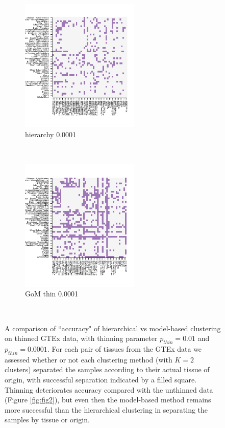 \begin{figure}[ht]
     \begin{subfigure}[t]{0.5\textwidth}
        \centering
        \includegraphics[height=2.5in]{../plots/rsz_1hierarchy_F_thin_0_0001.png}
        \caption{hierarchy 0.0001}
    \end{subfigure}%
    ~
    \begin{subfigure}[t]{0.5\textwidth}
        \centering
        \includegraphics[height=2.5in]{../plots/rsz_1admixture_F_thin_0_0001.png}
        \caption{GoM thin 0.0001}
    \end{subfigure}\\

 \caption{A comparison of ``accuracy" of hierarchical vs model-based clustering on thinned GTEx data, with thinning parameter $p_{thin}=0.01$ and $p_{thin}=0.0001$.  For each pair of tissues from the GTEx data we assessed whether or not each clustering method (with $K=2$ clusters) separated the samples according to their actual tissue of origin, with successful separation indicated by a filled square. Thinning deteriorates accuracy compared with the unthinned data (Figure \ref{fig:fig2}), but even then the model-based method remains more successful than the hierarchical clustering in separating the samples by tissue or origin.}
 \label{fig:figS2}
\end{figure}
\clearpage
